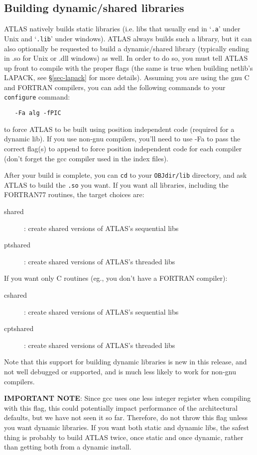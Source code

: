 \documentclass[11pt]{article}
\begin{document}
\subsection{Building dynamic/shared libraries}
\label{sec-shared}
ATLAS natively builds static libraries (i.e. libs that usually end in
`\texttt{.a}' under Unix and `\texttt{.lib}' under windows).  
ATLAS always builds such a library,
but it can also optionally be requested to build a dynamic/shared library
(typically ending in .so for Unix or .dll windows) as well.  In order to do so,
you must tell ATLAS up front to compile with the proper flags (the same is
true when building netlib's LAPACK, see \S\ref{sec-lapack} for more details).  
Assuming
you are using the gnu C and FORTRAN compilers, you can add the following
commands to your {\tt configure} command:
\vspace*{-0.1in}
\begin{verbatim}
   -Fa alg -fPIC
\end{verbatim}
to force ATLAS to be built using position independent code (required for a
dynamic lib).  If you use non-gnu compilers, you'll need to use -Fa to
pass the correct flag(s) to append to force position independent code for
each compiler (don't forget the gcc compiler used in the index files).

After your build is complete, you can {\tt cd} to your {\tt OBJdir/lib} 
directory, and
ask ATLAS to build the {\tt .so} you want.  If you want all libraries, including
the FORTRAN77 routines, the target choices are:
\begin{description}
\item [shared] : create shared versions of ATLAS's sequential libs
\item [ptshared] : create shared versions of ATLAS's threaded libs
\end{description}
If you want only C routines (eg., you don't have a FORTRAN compiler):
\begin{description}
\item [cshared] : create shared versions of ATLAS's sequential libs
\item [cptshared] : create shared versions of ATLAS's threaded libs
\end{description}

Note that this support for building dynamic libraries is new in this release,
and not well debugged or supported, and is much less likely to work for
non-gnu compilers.

\textbf{IMPORTANT NOTE}: Since gcc uses one less integer register when
      compiling with this flag, this
      could potentially impact performance of the architectural defaults,
      but we have not seen it so far.  Therefore, do not throw this flag
      unless you want dynamic libraries.  If you want both static and dynamic
      libs, the safest thing is probably to build ATLAS twice, once static
      and once dynamic, rather than getting both from a dynamic install.
\end{document}
